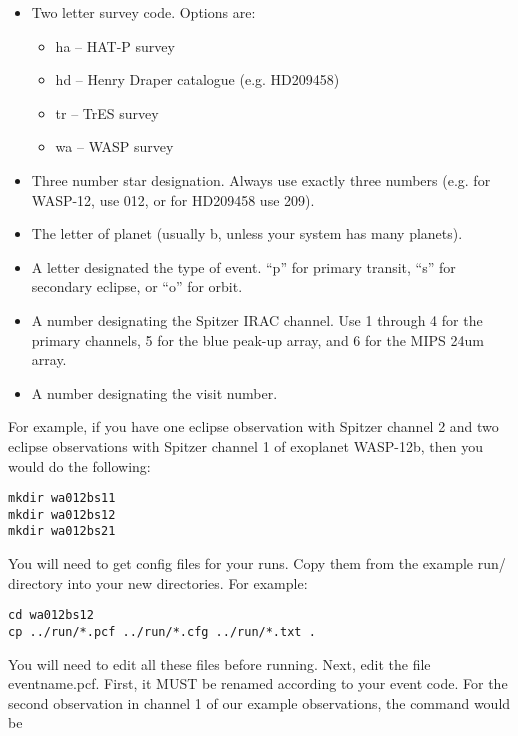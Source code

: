 \documentclass[letterpaper,12pt]{article}
\begin{document}
\begin{itemize}
\item Two letter survey code. Options are:
  \begin{itemize}
  \item ha -- HAT-P survey
  \item hd -- Henry Draper catalogue (e.g. HD209458)
  \item tr -- TrES survey
  \item wa -- WASP survey
  \end{itemize}

  \item Three number star designation. Always use exactly three numbers (e.g.
    for WASP-12, use 012, or for HD209458 use 209).

  \item The letter of planet (usually b, unless your system has many planets).

  \item A letter designated the type of event. ``p'' for primary transit,
    ``s'' for secondary eclipse, or ``o'' for orbit.

  \item A number designating the Spitzer IRAC channel. Use 1 through 4 for
    the primary channels, 5 for the blue peak-up array, and 6 for the MIPS
    24um array.

  \item A number designating the visit number.
\end{itemize}
    
For example, if you have one eclipse observation with Spitzer channel
2 and two eclipse observations with Spitzer channel 1 of exoplanet
WASP-12b, then you would do the following:

\begin{verbatim}
mkdir wa012bs11
mkdir wa012bs12
mkdir wa012bs21
\end{verbatim}

You will need to get config files for your runs. Copy them from the example
run/ directory into your new directories. For example:

\begin{verbatim}
cd wa012bs12
cp ../run/*.pcf ../run/*.cfg ../run/*.txt .
\end{verbatim}

You will need to edit all these files before running. Next, edit the
file eventname.pcf. First, it MUST be renamed according to your event
code. For the second observation in channel 1 of our example
observations, the command would be
\end{document}
